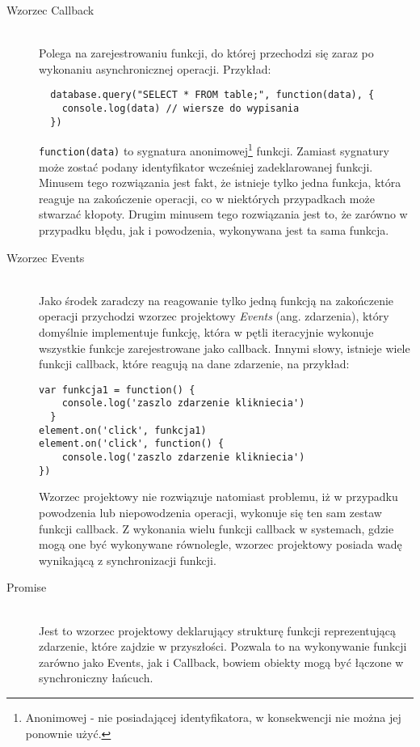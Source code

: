 \begin{description}
  \item[ Wzorzec Callback] \hfill \\
  Polega na zarejestrowaniu funkcji, do której przechodzi się zaraz po wykonaniu asynchronicznej operacji. Przykład:
  \lstset{language=Octave}
  \begin{lstlisting}
  database.query("SELECT * FROM table;", function(data), {
  	console.log(data) // wiersze do wypisania
  })
  \end{lstlisting}
  \lstinline{function(data)} to sygnatura anonimowej\footnote{Anonimowej - nie posiadającej identyfikatora, w konsekwencji nie można jej ponownie użyć.} funkcji. Zamiast sygnatury może zostać podany identyfikator wcześniej zadeklarowanej funkcji. Minusem tego rozwiązania jest fakt, że istnieje tylko jedna funkcja, która reaguje na zakończenie operacji, co w niektórych przypadkach może stwarzać kłopoty. Drugim minusem tego rozwiązania jest to, że zarówno w przypadku błędu, jak i powodzenia, wykonywana jest ta sama funkcja.
  \item[Wzorzec Events] \hfill \\
  Jako środek zaradczy na reagowanie tylko jedną funkcją na zakończenie operacji przychodzi wzorzec projektowy \emph{Events} (ang. zdarzenia), który domyślnie implementuje funkcję, która w pętli iteracyjnie wykonuje wszystkie funkcje zarejestrowane jako callback. Innymi słowy, istnieje wiele funkcji callback, które reagują na dane zdarzenie, na przykład:\\

\lstset{language=Octave}
\begin{lstlisting}
var funkcja1 = function() {
	console.log('zaszlo zdarzenie klikniecia')
  }
element.on('click', funkcja1)
element.on('click', function() {
	console.log('zaszlo zdarzenie klikniecia')
})
\end{lstlisting}

  Wzorzec projektowy nie rozwiązuje natomiast problemu, iż w przypadku powodzenia lub niepowodzenia operacji, wykonuje się ten sam zestaw funkcji callback. Z wykonania wielu funkcji callback w systemach, gdzie mogą one być wykonywane równolegle, wzorzec projektowy posiada wadę wynikającą z synchronizacji funkcji.
  
  \item[Promise] \hfill \\
  Jest to wzorzec projektowy deklarujący strukturę funkcji reprezentującą zdarzenie, które zajdzie w przyszłości. Pozwala to na wykonywanie funkcji zarówno jako Events, jak i Callback, bowiem obiekty mogą być łączone w synchroniczny łańcuch.
\end{description}

